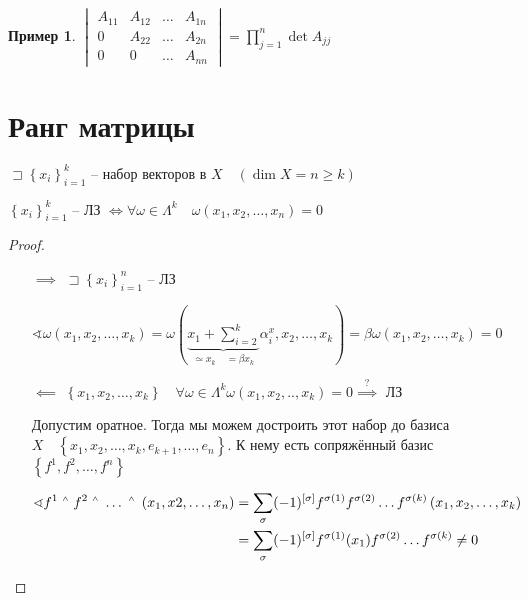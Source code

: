 \documentclass{book}
\let\latexwedge\wedge
\def\wedge{\,\raisebox{0.5ex}{\ensuremath{\scriptscriptstyle\latexwedge}\,}}
\theoremstyle{definition}
\newtheorem*{example}{Пример}
\begin{document}
\begin{example}
    $
    \begin{vmatrix}
        A_{11} & A_{12} & \ldots & A_{1n}\\
        0 & A_{22} & \ldots & A_{2n}\\
        0&0&\ldots & A_{nn}
    \end{vmatrix} = \prod_{j=1}^n \det A_{jj}$
\end{example}

\section{Ранг матрицы}

    $\sqsupset \left\{ x_i \right\} _{i=1}^k$ -- набор векторов в $X\quad \left( \dim X = n \geqslant k \right) $ 

    \begin{lemma}
        $\left\{ x_i \right\} _{i=1}^k$ -- ЛЗ $\iff \forall \omega\in  \Lambda^k\quad \omega\left( x_1, x_2, \ldots, x_n \right) = 0$
    \end{lemma}
    \begin{proof}
        \begin{itemize}
            \item []
            \item [$\implies $] $\sqsupset \left\{ x_i \right\} _{i=1}^n$ -- ЛЗ

                $\sphericalangle \omega\left( x_1, x_2, \ldots, x_k \right) = \omega\left( \underbrace{x_1+\sum_{i=2}^{k}}\limits_{\simeq x_k\quad = \beta x_k} \alpha^x_i, x_2, \ldots, x_k \right) = \beta\omega\left( x_1, x_2, \ldots, x_k \right) = 0 $
            \item [$\impliedby $] $\left\{ x_1, x_2, \ldots, x_k \right\} \quad \forall \omega\in\Lambda ^k\omega\left( x_1, x_2, .., x_k \right) =0 \overset ? {\implies } $ ЛЗ

                Допустим оратное. Тогда мы можем достроить этот набор до базиса $X\quad \left\{ x_1, x_2, \ldots, x_k, e_{k+1}, \ldots, e_n \right\} $. К нему есть сопряжённый базис $\left\{ f^1, f^2, \ldots, f^n \right\} $ 

                \begin{align}
                    \sphericalangle f^1\wedge f^2 \wedge \ldots \wedge \left( x_1, x2, \ldots, x_n \right) &= \sum_{\sigma} (-1)^{\left[ \sigma \right] } f^{\sigma(1)}f^{\sigma(2)}\ldots f^{\sigma(k)}\left( x_1, x_2, \ldots, x_k \right) \\
                                                                                                           &= \sum_{\sigma}(-1)^{\left[ \sigma \right] }f^{\sigma(1)}(x_1)f^{\sigma(2)}\ldots f^{\sigma(k)}\neq 0 \\
                \end{align}
        \end{itemize}
    \end{proof}
\end{document}
